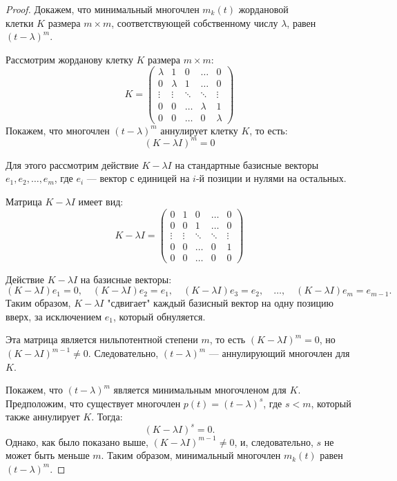 \begin{proof}
Докажем, что минимальный многочлен \( m_{k}(t) \) жордановой \\клетки \( K \) размера \( m \times m \), соответствующей собственному числу \( \lambda \), равен \( (t - \lambda)^m \).

Рассмотрим жорданову клетку \( K \) размера \( m \times m \):
\[
K = \begin{pmatrix}
\lambda & 1 & 0 & \ldots & 0 \\
0 & \lambda & 1 & \ldots & 0 \\
\vdots & \vdots & \ddots & \ddots & \vdots \\
0 & 0 & \ldots & \lambda & 1 \\
0 & 0 & \ldots & 0 & \lambda
\end{pmatrix}
\]
Покажем, что многочлен \( (t - \lambda)^m \) аннулирует клетку \( K \), то есть:
\[
(K - \lambda I)^m = 0
\]

Для этого рассмотрим действие \( K - \lambda I \) на стандартные базисные векторы \( e_1, e_2, \dots, e_m \), где \( e_i \) — вектор с единицей на \( i \)-й позиции и нулями на остальных.


Матрица \( K - \lambda I \) имеет вид:
\[
K - \lambda I = \begin{pmatrix}
0 & 1 & 0 & \ldots & 0 \\
0 & 0 & 1 & \ldots & 0 \\
\vdots & \vdots & \ddots & \ddots & \vdots \\
0 & 0 & \ldots & 0 & 1 \\
0 & 0 & \ldots & 0 & 0
\end{pmatrix}
\]

Действие \( K - \lambda I \) на базисные векторы:
\[
(K - \lambda I) e_1 = 0, \quad (K - \lambda I) e_2 = e_1, \quad (K - \lambda I) e_3 = e_2, \quad \ldots, \quad (K - \lambda I) e_m = e_{m-1}.
\]
Таким образом, \( K - \lambda I \) "сдвигает" каждый базисный вектор на одну позицию вверх, за исключением \( e_1 \), который обнуляется.

Эта матрица является нильпотентной степени \( m \), то есть \( (K - \lambda I)^m = 0 \), но \\\( (K - \lambda I)^{m-1} \neq 0 \). Следовательно, \( (t - \lambda)^m \) — аннулирующий многочлен для \( K \).

Покажем, что \( (t - \lambda)^m \) является минимальным многочленом для \( K \). Предположим, что существует многочлен \( p(t) = (t - \lambda)^s \), где \( s < m \), который также аннулирует \( K \). Тогда:
\[
(K - \lambda I)^s = 0.
\]
Однако, как было показано выше, \( (K - \lambda I)^{m-1} \neq 0 \), и, следовательно, \( s \) не может быть меньше \( m \). Таким образом, минимальный многочлен \( m_{k}(t) \) равен \( (t - \lambda)^m \).



\end{proof}
